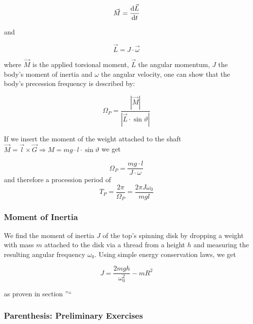 \documentclass{scrreprt}
\begin{document}
\begin{equation}
\vec{M} = \frac{\dif \vec{L}}{\dif t}
\end{equation}

and

\begin{equation}
\vec{L} = J \cdot \vec{\omega}
\end{equation}

where $\vec{M}$ is the applied torsional moment, $\vec{L}$ the angular momentum, $J$ the body's moment of inertia and $\omega$ the angular velocity, one can show that the body's precession frequency is described by:

\begin{equation}
\Omega_P = \frac{|\vec{M}|}{|\vec{L}\cdot \sin \vartheta|}
\end{equation}

If we insert the moment of the weight attached to the shaft $\vec{M} = \vec{l} \times \vec{G} \Rightarrow M = m g \cdot l \cdot \sin \vartheta$ we get

\begin{equation}
\Omega_P = \frac{mg\cdot l}{J\cdot \omega}
\end{equation}
and therefore a procession period of
\begin{equation}
T_P = \frac{2\pi}{\Omega_P} = \frac{2\pi J \omega_0}{mgl}
\end{equation}

\subsubsection{Moment of Inertia}

We find the moment of inertia $J$ of the top's spinning disk by dropping a weight with mass $m$ attached to the disk via a thread from a height $h$ and measuring the resulting angular frequency $\omega_0$. Using simple energy conservation laws, we get

\begin{equation}
\label{eq:inertia}
J = \frac{2mgh}{\omega_0^2} - m R^2
\end{equation}

as proven in section ''``

\subsubsection{Parenthesis: Preliminary Exercises}
\label{sec:preliminary_exercises}
\end{document}
